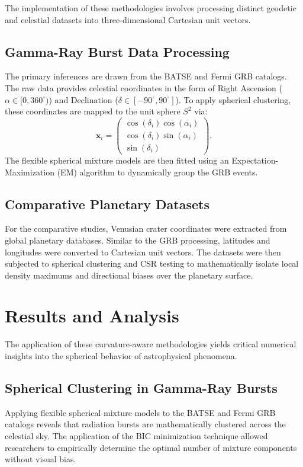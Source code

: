 \documentclass[12pt,a4paper]{report}
\begin{document}
The implementation of these methodologies involves processing distinct geodetic and celestial datasets into three-dimensional Cartesian unit vectors.

\subsection{Gamma-Ray Burst Data Processing}
The primary inferences are drawn from the BATSE and Fermi GRB catalogs. The raw data provides celestial coordinates in the form of Right Ascension ($\alpha \in [0, 360^\circ)$) and Declination ($\delta \in [-90^\circ, 90^\circ]$). To apply spherical clustering, these coordinates are mapped to the unit sphere $S^2$ via:
\begin{equation}
\mathbf{x}_i = \begin{pmatrix} \cos(\delta_i) \cos(\alpha_i) \\ \cos(\delta_i) \sin(\alpha_i) \\ \sin(\delta_i) \end{pmatrix}.
\end{equation}
The flexible spherical mixture models are then fitted using an Expectation-Maximization (EM) algorithm to dynamically group the GRB events.

\subsection{Comparative Planetary Datasets}
For the comparative studies, Venusian crater coordinates were extracted from global planetary databases. Similar to the GRB processing, latitudes and longitudes were converted to Cartesian unit vectors. The datasets were then subjected to spherical clustering and CSR testing to mathematically isolate local density maximums and directional biases over the planetary surface.

\section{Results and Analysis}
The application of these curvature-aware methodologies yields critical numerical insights into the spherical behavior of astrophysical phenomena.

\subsection{Spherical Clustering in Gamma-Ray Bursts}
Applying flexible spherical mixture models to the BATSE and Fermi GRB catalogs reveals that radiation bursts are mathematically clustered across the celestial sky. The application of the BIC minimization technique allowed researchers to empirically determine the optimal number of mixture components without visual bias.
\end{document}
